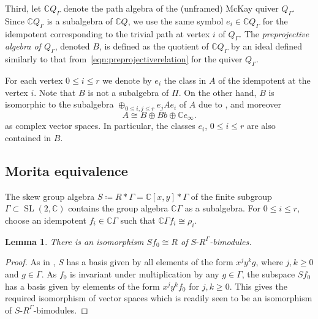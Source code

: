 \documentclass[pdftex]{sigma}%
\newtheorem{Lemma}[Theorem]{Lemma}
\newcommand{\SC}{\mathbb{C}} %
\newcommand{\SL}{\operatorname{SL}}
\newcommand{\PiGamma}{B}
\newcommand{\PiQ}{A}
\numberwithin{equation}{section}
\begin{document}
 Third, let $\SC Q_\Gamma$ denote the path algebra of the (unframed) McKay quiver $Q_\Gamma$. Since $\SC Q_\Gamma$ is a subalgebra of $\SC Q$, we use the same symbol $e_i\in \SC Q_\Gamma$ for the idempotent corresponding to the trivial path at vertex $i$ of $Q_\Gamma$. The \emph{preprojective algebra of $Q_\Gamma$}, denoted $\PiGamma$, is defined as the quotient of $\SC Q_\Gamma$ by an ideal defined similarly to that from~\eqref{eqn:preprojectiverelation} for the quiver $Q_\Gamma$.

\begin{Remark}
 For each vertex $0\leq i\leq r$ we denote by $e_i$ the class in $\PiQ$ of the idempotent at the vertex $i$. Note that $\PiGamma$ is not a subalgebra of $\Pi$. On the other hand, $\PiGamma$ is isomorphic to the subalgebra $\oplus_{0 \leq i,j \leq r} e_j\PiQ e_i$ of $\PiQ$ due to \cite[Lemma~3.2]{craw2019punctual}, and moreover
 \begin{equation} \label{eq:PiQdecomp}
 \PiQ \cong \PiGamma \oplus \PiGamma b \oplus \SC e_\infty.
\end{equation}
as complex vector spaces. In particular, the classes $e_i$, $0 \leq i \leq r$ are also contained in $\PiGamma$.
\end{Remark}

\subsection{Morita equivalence}
The skew group algebra $S \coloneqq R \ast \Gamma=\SC[x,y]\ast \Gamma$ of the finite subgroup $\Gamma\subset \SL(2,\SC)$ contains the group algebra $\SC\Gamma$ as a subalgebra. For $0\leq i\leq r$, choose an idempotent $f_i\in \mathbb{C}\Gamma$ such that $\mathbb{C}\Gamma f_i\cong \rho_i$.

\begin{Lemma}\label{lem:polyring}
There is an isomorphism $S f_0 \cong R$ of $S\text{-}R^\Gamma$-bimodules.
\end{Lemma}
\begin{proof}
As in \cite[Lemma~1.1]{crawley1998noncommutative}, $S$ has a basis given by all elements of the form $x^jy^kg$, where $j,k \geq 0$ and $g \in \Gamma$. As $f_0$ is invariant under multiplication by any $g \in \Gamma$, the subspace $Sf_0$ has a basis given by elements of the form $x^jy^kf_0$ for $j,k \geq 0$. This gives the required isomorphism
of vector spaces which is readily seen to be an isomorphism of $S\text{-}R^\Gamma$-bimodules.
\end{proof}
\end{document}

